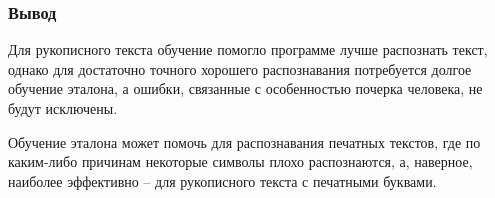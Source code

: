 	\FloatBarrier
	
	\subsubsection{Вывод}
		Для рукописного текста обучение помогло программе лучше распознать текст, однако для достаточно точного хорошего распознавания потребуется долгое обучение эталона, а ошибки, связанные с особенностью почерка человека, не будут исключены.
		
		Обучение эталона может помочь для распознавания печатных текстов, где по каким-либо причинам некоторые символы плохо распознаются, а, наверное, наиболее эффективно – для рукописного текста с печатными буквами.
